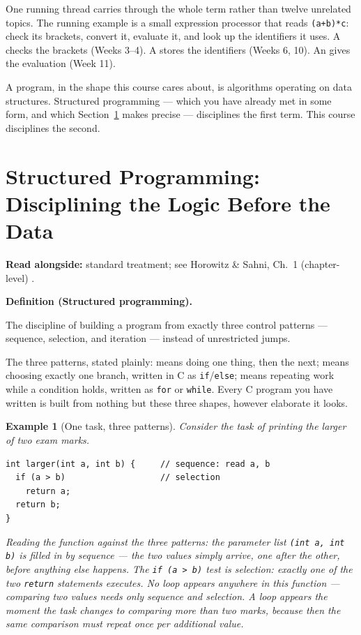\documentclass[11pt]{article}
\newtheorem{example}{Example}[section]
\newenvironment{definitionbox}[1]{%
  \par\noindent\textbf{Definition (#1).}\ \itshape
}{\par\vspace{0.3em}}
\begin{document}
One running thread carries through the whole term rather than twelve
unrelated topics. The running example is a small expression processor that
reads \texttt{(a+b)*c}: check its brackets, convert it, evaluate it, and look
up the identifiers it uses. A  checks the brackets (Weeks 3--4). A
 stores the identifiers (Weeks 6, 10). An  gives the evaluation (Week 11). 

A program, in the shape this course cares about, is algorithms operating on
data structures. Structured programming --- which you have already met in
some form, and which Section~\ref{sec:structured} makes precise --- disciplines
the first term. This course disciplines the second.

\section{Structured Programming: Disciplining the Logic Before the Data}
\label{sec:structured}

\textbf{Read alongside:} standard treatment; see Horowitz \& Sahni, Ch.~1 (chapter-level) \cite{HorowitzSahni2008_fundamentals_data_structures}.

\begin{definitionbox}{Structured programming}
The discipline of building a program from exactly three control patterns ---
sequence, selection, and iteration --- instead of unrestricted jumps.
\end{definitionbox}

The three patterns, stated plainly:  means doing one thing,
then the next;  means choosing exactly one branch, written in
C as \texttt{if}/\texttt{else};  means repeating work while a
condition holds, written as \texttt{for} or \texttt{while}. Every C program
you have written is built from nothing but these three shapes, however
elaborate it looks.

\begin{example}[One task, three patterns]
Consider the task of printing the larger of two exam marks.
{\footnotesize
\begin{verbatim}
int larger(int a, int b) {     // sequence: read a, b
  if (a > b)                   // selection
    return a;
  return b;
}
\end{verbatim}
}
Reading the function against the three patterns: the parameter list
\texttt{(int a, int b)} is filled in by \emph{sequence} --- the two values
simply arrive, one after the other, before anything else happens. The
\texttt{if (a > b)} test is \emph{selection}: exactly one of the two
\texttt{return} statements executes. No loop appears anywhere in this
function --- comparing two values needs only sequence and selection. A loop
appears the moment the task changes to comparing \emph{more than two} marks,
because then the same comparison must repeat once per additional value.
\end{example}
\end{document}
